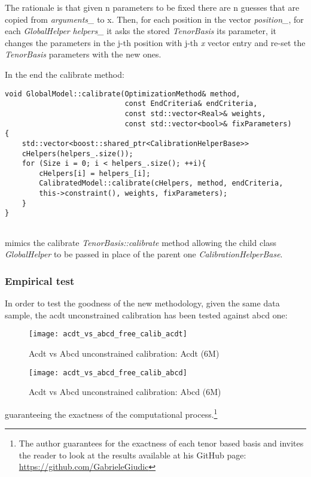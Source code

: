 The rationale is that given n parameters to be fixed there are n guesses that are copied from \textit{arguments\_} to x. Then, for each position in the vector \textit{position\_}, for each \textit{GlobalHelper} \textit{helpers\_} it asks the stored \textit{TenorBasis} its parameter, it changes the parameters in the j-th position with j-th \textit{x} vector entry and re-set  the \textit{TenorBasis} parameters with the new ones.

In the end the calibrate method:

\begin{lstlisting}
void GlobalModel::calibrate(OptimizationMethod& method,
                            const EndCriteria& endCriteria,
                            const std::vector<Real>& weights,
                            const std::vector<bool>& fixParameters)
{
    std::vector<boost::shared_ptr<CalibrationHelperBase>> 
    cHelpers(helpers_.size());
    for (Size i = 0; i < helpers_.size(); ++i){
        cHelpers[i] = helpers_[i];
        CalibratedModel::calibrate(cHelpers, method, endCriteria,
        this->constraint(), weights, fixParameters);
    }
}
       
\end{lstlisting}

mimics the calibrate \textit{TenorBasis::calibrate} method allowing the child class \textit{GlobalHelper} to be passed in place of the parent one \textit{CalibrationHelperBase}.

\subsubsection{Empirical test}
In order to test the goodness of the new methodology, given the same data sample, the acdt unconstrained calibration has been tested against abcd one:

\begin{figure}[H]
\centering
\texttt{[image: acdt\_vs\_abcd\_free\_calib\_acdt]}
\caption{Acdt vs Abcd unconstrained calibration: Acdt (6M) }
\end{figure}

\begin{figure}[H]
\centering
\texttt{[image: acdt\_vs\_abcd\_free\_calib\_abcd]}
\caption{Acdt vs Abcd unconstrained calibration: Abcd (6M) }
\end{figure}

guaranteeing the exactness of the computational process.\footnote{The author guarantees for the exactness of each tenor based basis and invites the reader to look at the results available at his GitHub page: \url{https://github.com/GabrieleGiudic}}

